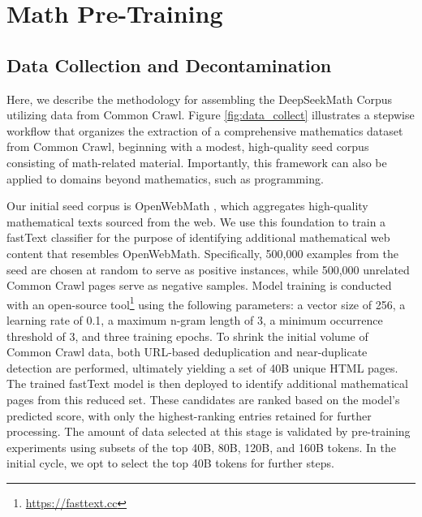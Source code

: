 \section{Math Pre-Training}

\subsection{Data Collection and Decontamination}
Here, we describe the methodology for assembling the DeepSeekMath Corpus utilizing data from Common Crawl. Figure \ref{fig:data_collect} illustrates a stepwise workflow that organizes the extraction of a comprehensive mathematics dataset from Common Crawl, beginning with a modest, high-quality seed corpus consisting of math-related material. Importantly, this framework can also be applied to domains beyond mathematics, such as programming.

Our initial seed corpus is OpenWebMath \citep{openwebmath}, which aggregates high-quality mathematical texts sourced from the web. We use this foundation to train a fastText classifier \citep{joulin2016fasttext} for the purpose of identifying additional mathematical web content that resembles OpenWebMath. Specifically, 500,000 examples from the seed are chosen at random to serve as positive instances, while 500,000 unrelated Common Crawl pages serve as negative samples. Model training is conducted with an open-source tool\footnote{\url{https://fasttext.cc}} using the following parameters: a vector size of 256, a learning rate of 0.1, a maximum n-gram length of 3, a minimum occurrence threshold of 3, and three training epochs. To shrink the initial volume of Common Crawl data, both URL-based deduplication and near-duplicate detection are performed, ultimately yielding a set of 40B unique HTML pages. The trained fastText model is then deployed to identify additional mathematical pages from this reduced set. These candidates are ranked based on the model's predicted score, with only the highest-ranking entries retained for further processing. The amount of data selected at this stage is validated by pre-training experiments using subsets of the top 40B, 80B, 120B, and 160B tokens. In the initial cycle, we opt to select the top 40B tokens for further steps.

